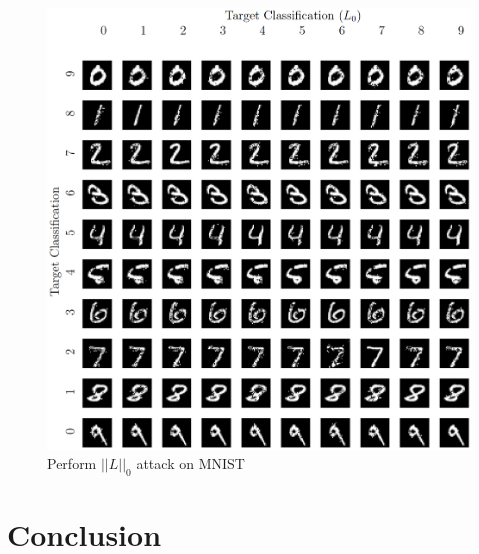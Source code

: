 \documentclass[12pt]{article}
\begin{document}
\begin{figure}[H]
	\centering
	\label{fig:L0-attack-sample}
	\caption{Perform $||L||_0$ attack on MNIST}
	\includegraphics[scale=0.47]{img/L0-attack-sample}
\end{figure}

%
%


\section{Conclusion}
\end{document}
